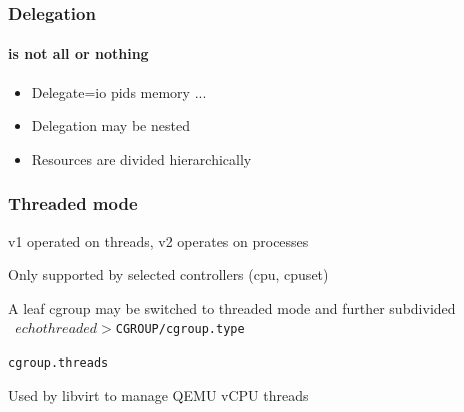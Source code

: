 \documentclass[serif]{beamer}
\begin{document}
\begin{frame}
  \frametitle{Delegation}
  \framesubtitle{is not all or nothing}

  \begin{itemize}
  \item Delegate=io pids memory ...
  \item Delegation may be nested
  \item Resources are divided hierarchically
  \end{itemize}
\end{frame}


\begin{frame}[fragile]
  \frametitle{Threaded mode}

  \pause

  v1 operated on threads, v2 operates on processes
  \medskip\pause

  Only supported by selected controllers (cpu, cpuset)
  \medskip\pause

  A leaf cgroup may be switched to threaded mode and further subdivided\\
  \texttt{        $ echo threaded > $CGROUP/cgroup.type}\\
  \pause

  \texttt{cgroup.threads}
  \medskip\pause

  Used by libvirt to manage QEMU vCPU threads
\end{frame}

\end{document}
